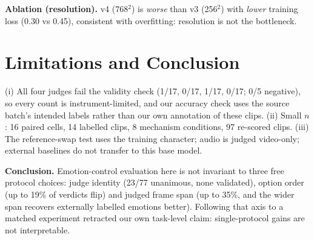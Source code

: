 \documentclass[conference]{IEEEtran}
\begin{document}
\textbf{Ablation (resolution).} v4 (768$^2$) is \emph{worse} than v3 (256$^2$) with \emph{lower}
training loss (0.30 vs 0.45), consistent with overfitting: resolution is not the bottleneck.

\section{Limitations and Conclusion}
(i) All four judges fail the validity check (1/17, 0/17, 1/17, 0/17; 0/5 negative), so every count is
instrument-limited, and our accuracy check uses the source batch's intended labels rather than our own
annotation of these clips. (ii) Small $n$: 16 paired cells, 14 labelled clips, 8 mechanism conditions, 97
re-scored clips. (iii) The reference-swap test uses the training character; audio is judged video-only;
external baselines do not transfer to this base model.

\textbf{Conclusion.} Emotion-control evaluation here is not invariant to three free protocol choices:
judge identity (23/77 unanimous, none validated), option order (up to 19\% of verdicts flip) and judged
frame span (up to 35\%, and the wider span recovers externally labelled emotions better). Following that
axis to a matched experiment retracted our own task-level claim: single-protocol gains are not
interpretable.
\end{document}
